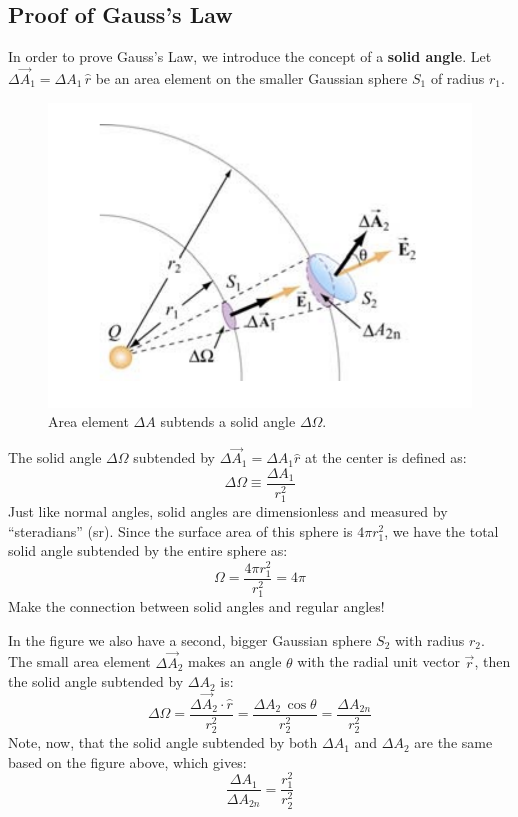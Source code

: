 \documentclass[11pt, letterpaper]{article}
\begin{document}
	\subsection{Proof of Gauss's Law}
	In order to prove Gauss's Law, we introduce the concept of a \textbf{solid angle}. Let 
	$\Delta \vec{A}_1 = \Delta A_1\, \hat{r}$ be an area element on the smaller Gaussian sphere 
	$S_1$ of radius $r_1$.
	\begin{figure}[h!]
		\centering
		\includegraphics[scale=0.5]{solid_angle}
		\caption{Area element $\Delta A$ subtends a solid angle $\Delta\Omega$.}
	\end{figure}
	
	The solid angle $\Delta \Omega$ subtended by $\Delta \vec{A}_1 = \Delta A_1 \hat{r}$ at the
	center is defined as: \[\Delta \Omega \equiv \frac{\Delta A_1}{r_1^2}\] Just like normal angles,
	solid angles are dimensionless and measured by ``steradians'' (sr). Since the surface area of
	this sphere is $4\pi r_1^2$, we have the total solid angle subtended by the entire sphere as:
	\[\Omega = \frac{4\pi r_1^2}{r_1^2} = 4\pi\]
	Make the connection between solid angles and regular angles!
	
	In the figure we also have a second, bigger Gaussian sphere $S_2$ with radius $r_2$. The
	small area element $\Delta \vec{A}_2$ makes an angle $\theta$ with the radial unit vector 
	$\vec{r}$, then the solid angle subtended by $\Delta A_2$ is: \[\Delta\Omega = 
	\frac{\Delta\vec{A}_2\cdot\hat{r}}{r_2^2} = \frac{\Delta A_2\,\cos\theta}{r_2^2} = \frac{\Delta 
	A_{2n}}{r_2^2}\] Note, now, that the solid angle subtended by both $\Delta A_1$ and 
	$\Delta A_2$ are the same based on the figure above, which gives: \[\frac{\Delta A_1}{
	\Delta A_{2n}} = \frac{r_1^2}{r_2^2}\]
	
\end{document}
